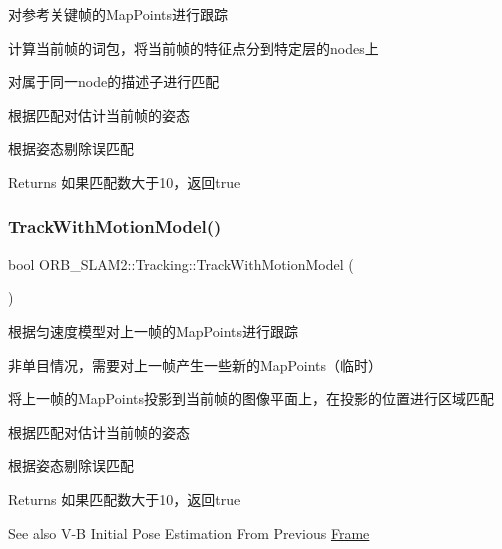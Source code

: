 对参考关键帧的\+Map\+Points进行跟踪 


\begin{DoxyEnumerate}
\item 计算当前帧的词包，将当前帧的特征点分到特定层的nodes上
\item 对属于同一node的描述子进行匹配
\item 根据匹配对估计当前帧的姿态
\item 根据姿态剔除误匹配 \begin{DoxyReturn}{Returns}
如果匹配数大于10，返回true 
\end{DoxyReturn}

\end{DoxyEnumerate}\mbox{\label{class_o_r_b___s_l_a_m2_1_1_tracking_aca19f1d69b30a6c6e49281d422ac8298}} 
\subsubsection{\texorpdfstring{Track\+With\+Motion\+Model()}{TrackWithMotionModel()}}
{\footnotesize\ttfamily bool O\+R\+B\+\_\+\+S\+L\+A\+M2\+::\+Tracking\+::\+Track\+With\+Motion\+Model (\begin{DoxyParamCaption}{ }\end{DoxyParamCaption})\hspace{0.3cm}{\ttfamily [protected]}}



根据匀速度模型对上一帧的\+Map\+Points进行跟踪 


\begin{DoxyEnumerate}
\item 非单目情况，需要对上一帧产生一些新的\+Map\+Points（临时）
\item 将上一帧的\+Map\+Points投影到当前帧的图像平面上，在投影的位置进行区域匹配
\item 根据匹配对估计当前帧的姿态
\item 根据姿态剔除误匹配 \begin{DoxyReturn}{Returns}
如果匹配数大于10，返回true 
\end{DoxyReturn}
\begin{DoxySeeAlso}{See also}
V-\/B Initial Pose Estimation From Previous \mbox{\hyperlink{class_o_r_b___s_l_a_m2_1_1_frame}{Frame}} 
\end{DoxySeeAlso}

\end{DoxyEnumerate}\mbox{\label{class_o_r_b___s_l_a_m2_1_1_tracking_aa84a20277d5bd022b527d79a58830bc5}} 
